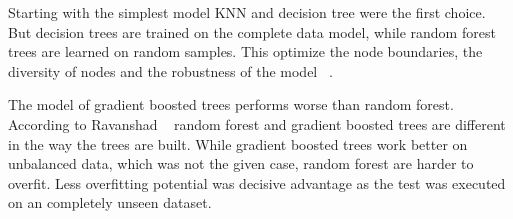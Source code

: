 Starting with the simplest model KNN and decision tree were the first choice. But decision trees are trained on the complete data model, while random forest trees are learned on random samples. This optimize the node boundaries, the diversity of nodes and the robustness of the model  ~\cite{ref_towardsRFvsDecision}.

The model of gradient boosted trees performs worse than random forest. According to Ravanshad ~\cite{ref_RFvsGBT} random forest and gradient boosted trees are different in the way the trees are built. While gradient boosted trees work better on unbalanced data, which was not the given case, random forest are harder to overfit. Less overfitting potential was decisive advantage as the test was executed on an completely unseen dataset.
